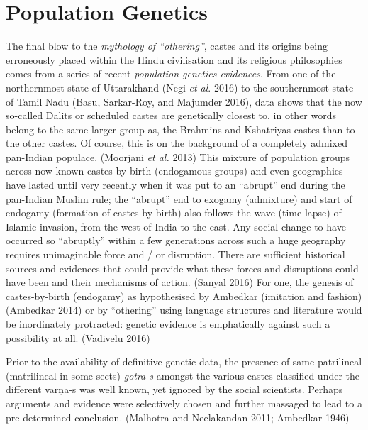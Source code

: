 \newpage

\section*{Population Genetics}

The final blow to the \textit{mythology of “othering”}, castes and its origins being erroneously placed within the Hindu civilisation and its religious philosophies comes from a series of recent \textit{population genetics evidences}. From one of the northernmost state of Uttarakhand (Negi \textit{et al}. 2016) to the southernmost state of Tamil Nadu (Basu, Sarkar-Roy, and Majumder 2016), data shows that the now so-called Dalits or scheduled castes are genetically closest to, in other words belong to the same larger group as, the Brahmins and Kshatriyas castes than to the other castes. Of course, this is on the background of a completely admixed pan-Indian populace. (Moorjani \textit{et al.} 2013) This mixture of population groups across now known castes-by-birth (endogamous groups) and even geographies have lasted until very recently when it was put to an “abrupt” end during the pan-Indian Muslim rule; the “abrupt” end to exogamy (admixture) and start of endogamy (formation of castes-by-birth) also follows the wave (time lapse) of Islamic invasion, from the west of India to the east. Any social change to have occurred so “abruptly” within a few generations across such a huge geography requires unimaginable force and / or disruption. There are sufficient historical sources and evidences that could provide what these forces and disruptions could have been and their mechanisms of action. (Sanyal 2016) For one, the genesis of castes-by-birth (endogamy) as hypothesised by Ambedkar (imitation and fashion) (Ambedkar 2014) or by “othering” using language structures and literature would be inordinately protracted: genetic evidence is emphatically against such a possibility at all. (Vadivelu 2016)

\vspace{.1cm}

Prior to the availability of definitive genetic data, the presence of same patrilineal (matrilineal in some sects) \textit{gotra-s} amongst the various castes classified under the different varṇa-s was well known, yet ignored by the social scientists. Perhaps arguments and evidence were selectively chosen and further massaged to lead to a pre-determined conclusion. (Malhotra and Neelakandan 2011; Ambedkar 1946)

\vspace{.1cm}

